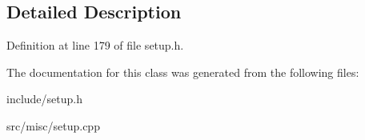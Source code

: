 \subsection{Detailed Description}


Definition at line 179 of file setup.\-h.



The documentation for this class was generated from the following files\-:\begin{DoxyCompactItemize}
\item 
include/setup.\-h\item 
src/misc/setup.\-cpp\end{DoxyCompactItemize}
